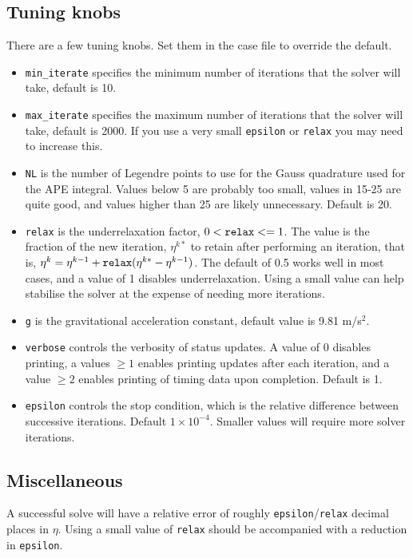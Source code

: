 \documentclass[letterpaper]{article}
\begin{document}
\subsection{Tuning knobs}
There are a few tuning knobs. Set them in the case file to override the default.
\begin{itemize}
 \item \verb+min_iterate+ specifies the minimum number of iterations that the solver will take, default is 10.
 \item \verb+max_iterate+ specifies the maximum number of iterations that the solver will take, default is 2000. If you use a very small \verb+epsilon+ or \verb+relax+ you may need to increase this. 
 \item \verb+NL+ is the number of Legendre points to use for the Gauss quadrature used for the APE integral. Values below 5 are probably too small, values in 15-25 are quite good, and values higher than 25 are likely unnecessary. Default is 20.
 \item \verb+relax+ is the underrelaxation factor, $0 < \verb+relax+ <= 1$.
        The value is the fraction of the new iteration, $\eta^{k*}$ to retain
        after performing an iteration, that is,
        $\eta^k = \eta^{k-1} + \verb+relax+(\eta^{k*} - \eta^{k-1})$.
        The default of 0.5 works well in most cases, and a value of 1 disables underrelaxation.
        Using a small value can help stabilise the solver at the expense of needing more iterations.
 \item \verb+g+ is the gravitational acceleration constant, default value is 9.81 m/s$^2$.
 \item \verb+verbose+ controls the verbosity of status updates. A value of 0 disables printing, a values $\ge 1$ enables printing updates after each iteration, and a value $\ge 2$ enables printing of timing data upon completion. Default is 1.
\item \verb+epsilon+ controls the stop condition, which is the relative difference between successive iterations. Default $1\times10^{-4}$. Smaller values will require more solver iterations.
\end{itemize}

\subsection{Miscellaneous}

A successful solve will have a relative error of roughly \verb+epsilon+/\verb+relax+ decimal places in $\eta$. Using a small value of \verb+relax+ should be accompanied with a reduction in \verb+epsilon+.
\end{document}
